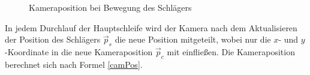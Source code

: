 \begin{figure}[t]
	\centering
	\vspace{1.5cm}%
	\vspace{-1.5cm}
	\caption{Kameraposition bei Bewegung des Schlägers}
	\label{fig:camera}
\end{figure}

In jedem Durchlauf der Hauptschleife wird der Kamera nach dem Aktualisieren der Position des Schlägers $\vec{p}_s$ die neue Position mitgeteilt, wobei nur die $x$- und $y$-Koordinate in die neue Kameraposition $\vec{p}_c$ mit einfließen. Die Kameraposition berechnet sich nach Formel \ref{camPos}. 

